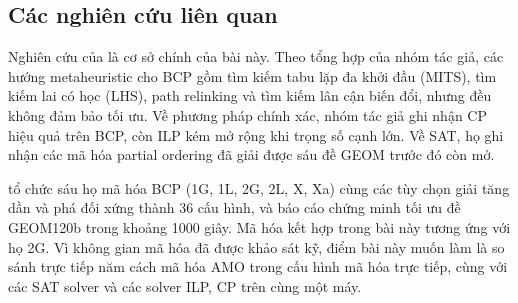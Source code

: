 \subsection{Các nghiên cứu liên quan}\label{sec:related}

Nghiên cứu của \citet{nguyen2026bcp} là cơ sở chính của bài này. Theo tổng hợp của nhóm tác giả, các hướng metaheuristic cho BCP gồm tìm kiếm tabu lặp đa khởi đầu (MITS), tìm kiếm lai có học (LHS), path relinking và tìm kiếm lân cận biến đổi, nhưng đều không đảm bảo tối ưu. Về phương pháp chính xác, nhóm tác giả ghi nhận CP hiệu quả trên BCP, còn ILP kém mở rộng khi trọng số cạnh lớn. Về SAT, họ ghi nhận các mã hóa partial ordering đã giải được sáu đề GEOM trước đó còn mở.

\citet{nguyen2026bcp} tổ chức sáu họ mã hóa BCP (1G, 1L, 2G, 2L, X, Xa) cùng các tùy chọn giải tăng dần và phá đối xứng thành 36 cấu hình, và báo cáo chứng minh tối ưu đề GEOM120b trong khoảng 1000 giây. Mã hóa kết hợp trong bài này tương ứng với họ 2G. Vì không gian mã hóa đã được khảo sát kỹ, điểm bài này muốn làm là so sánh trực tiếp năm cách mã hóa AMO trong cấu hình mã hóa trực tiếp, cùng với các SAT solver và các solver ILP, CP trên cùng một máy.
